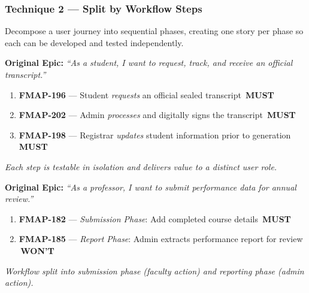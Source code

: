 \documentclass[12pt, a4paper]{article}
\newcommand{\mustbadge}{\colorbox{mustcolor}{\color{white}\tiny\bfseries\,MUST\,}}
\newcommand{\wontbadge}{\colorbox{wontcolor}{\color{white}\tiny\bfseries\,WON'T\,}}
\begin{document}
\vspace{10pt}
\subsubsection{Technique 2 --- Split by Workflow Steps}

Decompose a user journey into sequential phases, creating one story per phase so each can be developed and tested independently.

\vspace{6pt}
\begin{tcolorbox}[storybox,title={\textbf{Example 2a: Transcript Management (Facilities Module)}},fonttitle=\bfseries\color{agileblue}]
\textbf{Original Epic:} \textit{``As a student, I want to request, track, and receive an official transcript.''}
\vspace{4pt}
\begin{enumerate}[itemsep=2pt]
\item \textbf{FMAP-196} --- Student \textit{requests} an official sealed transcript \mustbadge
\item \textbf{FMAP-202} --- Admin \textit{processes} and digitally signs the transcript \mustbadge
\item \textbf{FMAP-198} --- Registrar \textit{updates} student information prior to generation \mustbadge
\end{enumerate}
\textit{Each step is testable in isolation and delivers value to a distinct user role.}
\end{tcolorbox}

\vspace{6pt}
\begin{tcolorbox}[storybox,title={\textbf{Example 2b: Performance Tracking (Staff Module)}},fonttitle=\bfseries\color{agileblue}]
\textbf{Original Epic:} \textit{``As a professor, I want to submit performance data for annual review.''}
\vspace{4pt}
\begin{enumerate}[itemsep=2pt]
\item \textbf{FMAP-182} --- \textit{Submission Phase}: Add completed course details \mustbadge
\item \textbf{FMAP-185} --- \textit{Report Phase}: Admin extracts performance report for review \wontbadge
\end{enumerate}
\textit{Workflow split into submission phase (faculty action) and reporting phase (admin action).}
\end{tcolorbox}

\vspace{10pt}
\end{document}
